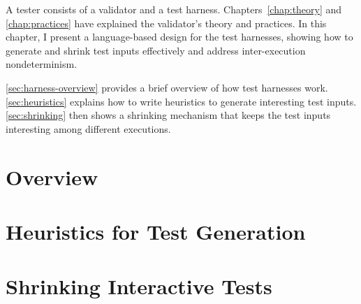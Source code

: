 A tester consists of a validator and a test harness.  Chapters~\ref{chap:theory}
and \ref{chap:practices} have explained the validator's theory and practices.
In this chapter, I present a language-based design for the test harnesses,
showing how to generate and shrink test inputs effectively and address
inter-execution nondeterminism.

\autoref{sec:harness-overview} provides a brief overview of how test harnesses
work.  \autoref{sec:heuristics} explains how to write heuristics to generate
interesting test inputs.  \autoref{sec:shrinking} then shows a shrinking
mechanism that keeps the test inputs interesting among different executions.

\section{Overview}
\label{sec:harness-overview}


\section{Heuristics for Test Generation}
\label{sec:heuristics}


\section{Shrinking Interactive Tests}
\label{sec:shrinking}

